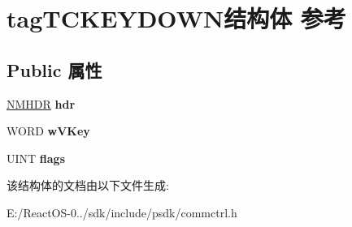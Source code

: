 \hypertarget{structtag_t_c_k_e_y_d_o_w_n}{}\section{tag\+T\+C\+K\+E\+Y\+D\+O\+W\+N结构体 参考}
\label{structtag_t_c_k_e_y_d_o_w_n}
\subsection*{Public 属性}
\begin{DoxyCompactItemize}
\item 
\mbox{\label{structtag_t_c_k_e_y_d_o_w_n_aac34f599a703e784ebac157133287266}} 
\hyperlink{structtag_n_m_h_d_r}{N\+M\+H\+DR} {\bfseries hdr}
\item 
\mbox{\label{structtag_t_c_k_e_y_d_o_w_n_abb510b339e656fa84c581bc4944620ad}} 
W\+O\+RD {\bfseries w\+V\+Key}
\item 
\mbox{\label{structtag_t_c_k_e_y_d_o_w_n_a587f3ce350d1412e479b68de3e1c80a3}} 
U\+I\+NT {\bfseries flags}
\end{DoxyCompactItemize}


该结构体的文档由以下文件生成\+:\begin{DoxyCompactItemize}
\item 
E\+:/\+React\+O\+S-\/0../sdk/include/psdk/commctrl.\+h\end{DoxyCompactItemize}
